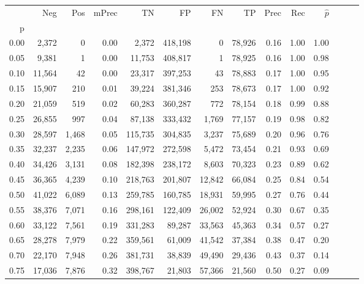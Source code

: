 \begin{tabular}{rrrrrrrrrrrrrr}
\toprule
{} &     Neg &    Pos & mPrec &       TN &       FP &      FN &      TP &  Prec &   Rec & $\hat{p}$ \\
p    &         &        &       &          &          &         &         &       &       &           \\
\midrule
0.00 &   2,372 &      0 &  0.00 &    2,372 &  418,198 &       0 &  78,926 &  0.16 &  1.00 &      1.00 \\
0.05 &   9,381 &      1 &  0.00 &   11,753 &  408,817 &       1 &  78,925 &  0.16 &  1.00 &      0.98 \\
0.10 &  11,564 &     42 &  0.00 &   23,317 &  397,253 &      43 &  78,883 &  0.17 &  1.00 &      0.95 \\
0.15 &  15,907 &    210 &  0.01 &   39,224 &  381,346 &     253 &  78,673 &  0.17 &  1.00 &      0.92 \\
0.20 &  21,059 &    519 &  0.02 &   60,283 &  360,287 &     772 &  78,154 &  0.18 &  0.99 &      0.88 \\
0.25 &  26,855 &    997 &  0.04 &   87,138 &  333,432 &   1,769 &  77,157 &  0.19 &  0.98 &      0.82 \\
0.30 &  28,597 &  1,468 &  0.05 &  115,735 &  304,835 &   3,237 &  75,689 &  0.20 &  0.96 &      0.76 \\
0.35 &  32,237 &  2,235 &  0.06 &  147,972 &  272,598 &   5,472 &  73,454 &  0.21 &  0.93 &      0.69 \\
0.40 &  34,426 &  3,131 &  0.08 &  182,398 &  238,172 &   8,603 &  70,323 &  0.23 &  0.89 &      0.62 \\
0.45 &  36,365 &  4,239 &  0.10 &  218,763 &  201,807 &  12,842 &  66,084 &  0.25 &  0.84 &      0.54 \\
0.50 &  41,022 &  6,089 &  0.13 &  259,785 &  160,785 &  18,931 &  59,995 &  0.27 &  0.76 &      0.44 \\
0.55 &  38,376 &  7,071 &  0.16 &  298,161 &  122,409 &  26,002 &  52,924 &  0.30 &  0.67 &      0.35 \\
0.60 &  33,122 &  7,561 &  0.19 &  331,283 &   89,287 &  33,563 &  45,363 &  0.34 &  0.57 &      0.27 \\
0.65 &  28,278 &  7,979 &  0.22 &  359,561 &   61,009 &  41,542 &  37,384 &  0.38 &  0.47 &      0.20 \\
0.70 &  22,170 &  7,948 &  0.26 &  381,731 &   38,839 &  49,490 &  29,436 &  0.43 &  0.37 &      0.14 \\
0.75 &  17,036 &  7,876 &  0.32 &  398,767 &   21,803 &  57,366 &  21,560 &  0.50 &  0.27 &      0.09 \\

\end{tabular}
